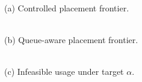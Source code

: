 \documentclass[border=1pt]{standalone}
\begin{document}
\begin{minipage}{31.0cm}
\centering
\begin{minipage}[t]{10.0cm}
	\centering
	\\[-0.1em]
	{\footnotesize (a) Controlled placement frontier.}
\end{minipage}\hspace{0.35cm}
\begin{minipage}[t]{10.0cm}
	\centering
	\\[-0.1em]
	{\footnotesize (b) Queue-aware placement frontier.}
\end{minipage}\hspace{0.35cm}
\begin{minipage}[t]{10.0cm}
	\centering
	\\[-0.1em]
	{\footnotesize (c) Infeasible usage under target $\alpha$.}
\end{minipage}
\end{minipage}
\end{document}
